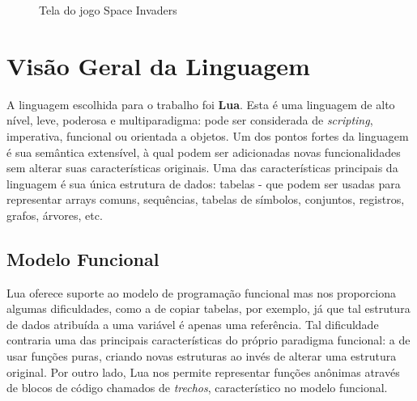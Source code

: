 \documentclass[rel_mlp]{iiufrgs}
\begin{document}
\begin{figure}[H]
     \centering
     \caption{Tela do jogo Space Invaders}
     \label{fig:figura1}
 \end{figure}


\chapter{Visão Geral da Linguagem}

A linguagem escolhida para o trabalho foi \textbf{Lua}. Esta é uma linguagem de alto nível, leve, poderosa e multiparadigma: pode ser considerada de \textit{scripting}, imperativa, funcional ou orientada a objetos. Um dos pontos fortes da linguagem é sua semântica extensível, à qual podem ser adicionadas novas funcionalidades sem alterar suas características originais. Uma das características principais da linguagem é sua única estrutura de dados: tabelas - que podem ser usadas para representar arrays comuns, sequências, tabelas de símbolos, conjuntos, registros, grafos, árvores, etc. \cite{ManualLua}

\section{Modelo Funcional}

Lua oferece suporte ao modelo de programação funcional mas nos proporciona algumas dificuldades, como a de copiar tabelas, por exemplo, já que tal estrutura de dados atribuída a uma variável é apenas uma referência. Tal dificuldade contraria uma das principais características do próprio paradigma funcional: a de usar funções puras, criando novas estruturas ao invés de alterar uma estrutura original. Por outro lado, Lua nos permite representar funções anônimas através de blocos de código chamados de \textit{trechos}, característico no modelo funcional. \cite{ManualLua}
\end{document}
